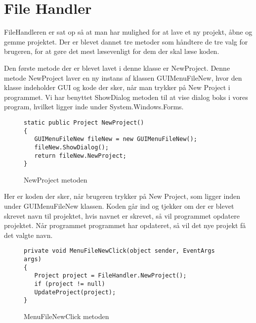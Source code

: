 \section{File Handler}\label{FileHandler}

FileHandleren er sat op så at man har mulighed for at lave et ny projekt, åbne og gemme projektet. Der er blevet dannet tre metoder som håndtere de tre valg for brugeren, for at gøre det mest læsevenligt for dem der skal læse koden.

\vspace{5mm}

Den første metode der er blevet lavet i denne klasse er NewProject. Denne metode NewProject laver en ny instans af klassen GUIMenuFileNew, hvor den klasse indeholder GUI og kode der sker, når man trykker på New Project i programmet. Vi har benyttet ShowDialog metoden til at vise dialog boks i vores program, hvilket ligger inde under System.Windows.Forms.

\begin{figure}[H]
\begin{lstlisting}
static public Project NewProject()
{
   GUIMenuFileNew fileNew = new GUIMenuFileNew();
   fileNew.ShowDialog();
   return fileNew.NewProject;
}
\end{lstlisting}
\caption{NewProject metoden}\label{NewProjectCode}
\end{figure}

\vspace{5mm}

Her er koden der sker, når brugeren trykker på New Project, som ligger inden under GUIMenuFileNew klassen. Koden går ind og tjekker om der er blevet skrevet navn til projektet, hvis navnet er skrevet, så vil programmet opdatere projektet. Når programmet programmet har opdateret, så vil det nye projekt få det valgte navn.

\begin{figure}[H]
\begin{lstlisting}
private void MenuFileNewClick(object sender, EventArgs args)
{
   Project project = FileHandler.NewProject();
   if (project != null)
   UpdateProject(project);
}
\end{lstlisting}
\caption{MenuFileNewClick metoden}\label{MenuFileNewClickCode}
\end{figure}

\vspace{5mm}

